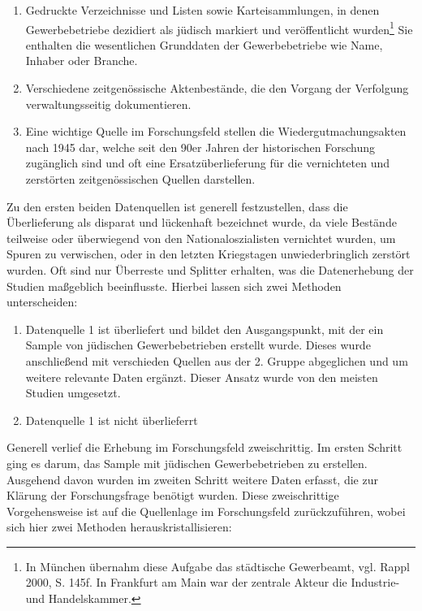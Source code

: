 \begin{enumerate}
    \item Gedruckte Verzeichnisse und Listen sowie Karteisammlungen, in denen Gewerbebetriebe dezidiert als jüdisch markiert und veröffentlicht wurden\footnote{In München übernahm diese Aufgabe das städtische Gewerbeamt, vgl. Rappl 2000, S. 145f. In Frankfurt am Main war der zentrale Akteur die Industrie- und Handelskammer.} Sie enthalten die wesentlichen Grunddaten der Gewerbebetriebe wie Name, Inhaber oder Branche.
    \item Verschiedene zeitgenössische Aktenbestände, die den Vorgang der Verfolgung verwaltungsseitig dokumentieren. 
    \item Eine wichtige Quelle im Forschungsfeld stellen die Wiedergutmachungsakten nach 1945 dar, welche seit den 90er Jahren der historischen Forschung zugänglich sind und oft eine Ersatzüberlieferung für die vernichteten und zerstörten zeitgenössischen Quellen darstellen.     
\end{enumerate}

Zu den ersten beiden Datenquellen ist generell festzustellen, dass die Überlieferung als disparat und lückenhaft bezeichnet wurde, da viele Bestände teilweise oder überwiegend von den Nationaloszialisten vernichtet wurden, um Spuren zu verwischen, oder in den letzten Kriegstagen unwiederbringlich zerstört wurden. Oft sind nur Überreste und Splitter erhalten, was die Datenerhebung der Studien maßgeblich beeinflusste. Hierbei lassen sich zwei Methoden unterscheiden:

\begin{enumerate}
    \item Datenquelle 1 ist überliefert und bildet den Ausgangspunkt, mit der ein Sample von jüdischen Gewerbebetrieben erstellt wurde. Dieses wurde anschließend mit verschieden Quellen aus der 2. Gruppe abgeglichen und um weitere relevante Daten ergänzt. Dieser Ansatz wurde von den meisten Studien umgesetzt.  
    \item Datenquelle 1 ist nicht überlieferrt 
\end{enumerate}
 


Generell verlief die Erhebung im Forschungsfeld zweischrittig. Im ersten Schritt ging es darum, das Sample mit jüdischen Gewerbebetrieben zu erstellen. Ausgehend davon wurden im zweiten Schritt weitere Daten erfasst, die zur Klärung der Forschungsfrage benötigt wurden. Diese zweischrittige Vorgehensweise ist auf die Quellenlage im Forschungsfeld zurückzuführen, wobei sich hier zwei Methoden herauskristallisieren:

